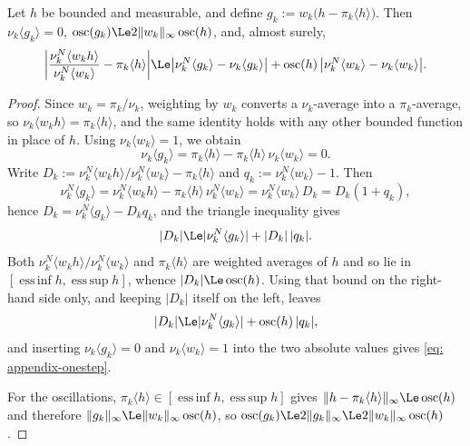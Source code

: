 \documentclass{article}
\begin{document}
\begin{lemma}
\label{lem: onestep}
Let $h$ be bounded and measurable, and define $g_k := w_k\bigl(h-\pi_k\langle h\rangle\bigr)$. Then $\nu_k\langle g_k\rangle=0$, $\operatorname{osc}(g_k)\Le2\lVert w_k\rVert_\infty\operatorname{osc}(h)$, and, almost surely,
\begin{equation}
    \biggl|\frac{\nu_k^N\langle w_kh\rangle}{\nu_k^N\langle w_k\rangle}-\pi_k\langle h\rangle\biggr|
    \Le \bigl|\nu_k^N\langle g_k\rangle-\nu_k\langle g_k\rangle\bigr|
    + \operatorname{osc}(h)\,\bigl|\nu_k^N\langle w_k\rangle-\nu_k\langle w_k\rangle\bigr| .
    \label{eq: appendix-onestep}
\end{equation}
\end{lemma}

\begin{proof}
Since $w_k=\pi_k/\nu_k$, weighting by $w_k$ converts a $\nu_k$-average into a $\pi_k$-average, so $\nu_k\langle w_kh\rangle=\pi_k\langle h\rangle$, and the same identity holds with any other bounded function in place of $h$. Using $\nu_k\langle w_k\rangle=1$, we obtain
\begin{equation*}
    \nu_k\langle g_k\rangle = \pi_k\langle h\rangle - \pi_k\langle h\rangle\,\nu_k\langle w_k\rangle = 0 .
\end{equation*}
Write $D_k := \nu_k^N\langle w_kh\rangle/\nu_k^N\langle w_k\rangle-\pi_k\langle h\rangle$ and $q_k := \nu_k^N\langle w_k\rangle-1$. Then
\begin{equation*}
    \nu_k^N\langle g_k\rangle = \nu_k^N\langle w_kh\rangle - \pi_k\langle h\rangle\,\nu_k^N\langle w_k\rangle
    = \nu_k^N\langle w_k\rangle\,D_k = D_k(1+q_k) ,
\end{equation*}
hence $D_k = \nu_k^N\langle g_k\rangle-D_kq_k$, and the triangle inequality gives
\begin{equation*}
    |D_k|\Le|\nu_k^N\langle g_k\rangle|+|D_k|\,|q_k| .
\end{equation*}
Both $\nu_k^N\langle w_kh\rangle/\nu_k^N\langle w_k\rangle$ and $\pi_k\langle h\rangle$ are weighted averages of $h$ and so lie in $[\operatorname{ess\,inf}h,\operatorname{ess\,sup}h]$, whence $|D_k|\Le\operatorname{osc}(h)$. Using that bound on the right-hand side only, and keeping $|D_k|$ itself on the left, leaves
\begin{equation*}
    |D_k|\Le|\nu_k^N\langle g_k\rangle|+\operatorname{osc}(h)\,|q_k| ,
\end{equation*}
and inserting $\nu_k\langle g_k\rangle=0$ and $\nu_k\langle w_k\rangle=1$ into the two absolute values gives \eqref{eq: appendix-onestep}.

For the oscillations, $\pi_k\langle h\rangle\in[\operatorname{ess\,inf}h,\operatorname{ess\,sup}h]$ gives $\lVert h-\pi_k\langle h\rangle\rVert_\infty\Le\operatorname{osc}(h)$ and therefore $\lVert g_k\rVert_\infty\Le\lVert w_k\rVert_\infty\operatorname{osc}(h)$, so $\operatorname{osc}(g_k)\Le2\lVert g_k\rVert_\infty\Le2\lVert w_k\rVert_\infty\operatorname{osc}(h)$.
\end{proof}
\end{document}

